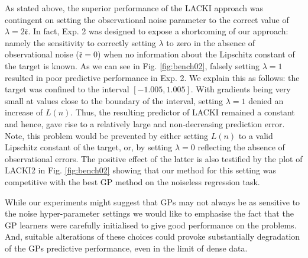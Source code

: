\documentclass{article} %
\theoremstyle{definition}
\theoremstyle{remark}
\newcommand{\hestthresh}{\ensuremath{ \lambda}}
\newcommand{\obserrbnd}{\bar{\mathfrak e}}
\begin{document}
As stated above, the superior performance of the LACKI approach was contingent on setting the observational noise parameter to the correct value of $\hestthresh = 2 \obserrbnd$. In fact, Exp. 2 was designed to expose a shortcoming of our approach: namely the sensitivity to correctly setting $\hestthresh$ to zero in the absence of observational noise ($\obserrbnd =0$) when no information about the Lipschitz constant of the target is known. As we can see in Fig. \ref{fig:bench02}, falsely setting $\hestthresh =1$ resulted in poor predictive performance in Exp. 2. We explain this as follows: the target was confined to the interval $[-1.005,1.005]$. With gradients being very small at values close to the boundary of the interval, setting $\hestthresh=1$ denied an increase of $L(n)$. Thus, the resulting predictor of LACKI remained a constant and hence, gave rise to a relatively large and non-decreasing prediction error.  
Note, this problem would be prevented by either setting $L(n)$ to a valid Lipschitz constant of the target, or, by setting $\lambda =0$ reflecting the absence of observational errors. The positive effect of the latter is also testified by the plot of LACKI2 in Fig. \ref{fig:bench02} showing that our method for this setting was competitive with the best GP method on the noiseless regression task.

While our experiments might suggest that GPs may not always be as sensitive to the noise hyper-parameter settings we would like to emphasise the fact that the GP learners were carefully initialised to give good performance on the problems. And, suitable alterations of these choices could provoke substantially degradation of the GPs predictive performance, even in the limit of dense data.  
\end{document}
